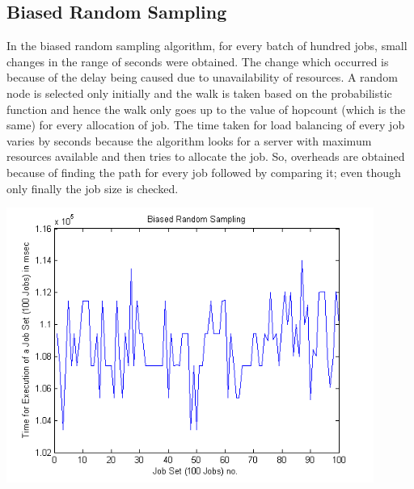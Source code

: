 \subsection{Biased Random Sampling}
In the biased random sampling algorithm, for every batch of hundred jobs, small changes in the range of seconds were obtained. The change which occurred is because of the delay being caused due to unavailability of resources. A random node is selected only initially and the walk is taken based on the probabilistic function and hence the walk only goes up to the value of hopcount (which is the same) for every allocation of job. The time taken for load balancing of every job varies by seconds because the algorithm looks for a server with maximum resources available and then tries to allocate the job. So, overheads are obtained because of finding the path for every job followed by comparing it; even though only finally the job size is checked.
\begin{center}
\includegraphics[width=0.9\textwidth]{biased}\\[0.3cm]
\end{center}

